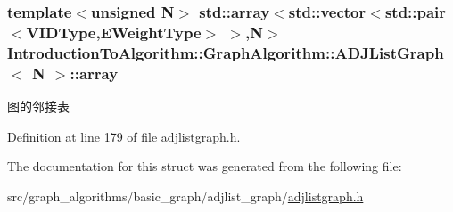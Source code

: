 \subsubsection[{array}]{\setlength{\rightskip}{0pt plus 5cm}template$<$unsigned N$>$ std\+::array$<$std\+::vector$<$std\+::pair$<${\bf V\+I\+D\+Type},{\bf E\+Weight\+Type}$>$ $>$,N$>$ {\bf Introduction\+To\+Algorithm\+::\+Graph\+Algorithm\+::\+A\+D\+J\+List\+Graph}$<$ N $>$\+::array}\label{struct_introduction_to_algorithm_1_1_graph_algorithm_1_1_a_d_j_list_graph_ac02abc1501b57a7963ec1b388150429e}
图的邻接表 

Definition at line 179 of file adjlistgraph.\+h.



The documentation for this struct was generated from the following file\+:\begin{DoxyCompactItemize}
\item 
src/graph\+\_\+algorithms/basic\+\_\+graph/adjlist\+\_\+graph/\hyperlink{adjlistgraph_8h}{adjlistgraph.\+h}\end{DoxyCompactItemize}
